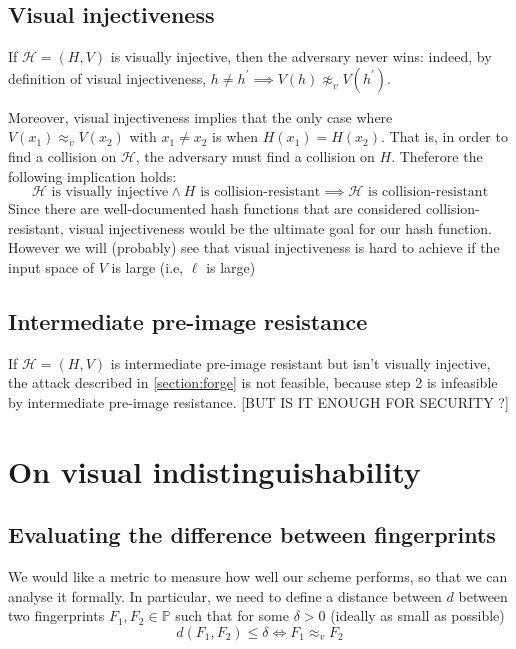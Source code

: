 \documentclass{article}
\newcommand{\bb}{\mathbb}
\newcommand{\vis}{\approx_v}
\newcommand{\hh}{\mathcal H}
\begin{document}
\subsection{Visual injectiveness}
If $\hh = (H,V)$ is visually injective, then the adversary never wins: indeed, by definition of visual injectiveness, $h \neq h^\prime  \implies V(h) \not\vis V(h^\prime)$. 

Moreover, visual injectiveness implies that the only case where $V(x_1) \vis V(x_2)$ with $x_1 \neq x_2$ is when $H(x_1) = H(x_2)$. That is, in order to find a collision on $\hh$, the adversary must find a collision on $H$. Theferore the following implication holds:
\begin{equation}
    \hh \text{ is visually injective} \wedge H \text{ is collision-resistant} \implies \hh \text{ is collision-resistant}
\end{equation}
\label{eq:sparse}
Since there are well-documented hash functions that are considered collision-resistant, visual injectiveness would be the ultimate goal for our hash function. However we will (probably) see that visual injectiveness is hard to achieve if the input space of $V$ is large (i.e, $\ell$ is large)

\subsection{Intermediate pre-image resistance}
If $\hh = (H,V)$ is intermediate pre-image resistant but isn't visually injective, the attack described in \cref{section:forge} is not feasible, because step 2 is infeasible by intermediate pre-image resistance. [BUT IS IT ENOUGH FOR SECURITY ?]


\section{On visual indistinguishability}
\subsection{Evaluating the difference between fingerprints}
We would like a metric to measure how well our scheme performs, so that we can analyse it formally. In particular, we need to define a distance between $d$ between two fingerprints $F_1,F_2 \in \bb P$ such that for some $\delta > 0$ (ideally as small as possible)
$$d(F_1,F_2) \leq \delta \iff F_1 \vis F_2$$
\end{document}
